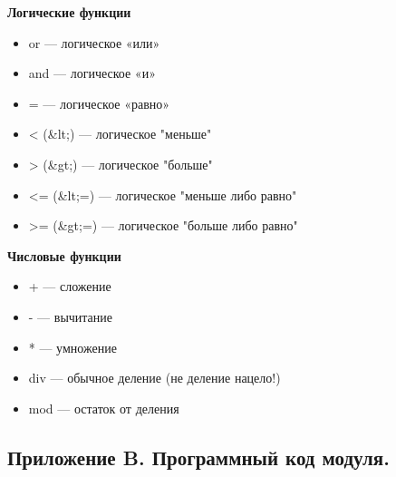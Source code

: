 \documentclass[12pt,a4paper,oneside]{article} %
\begin{document}
\textbf{Логические функции}

\begin{itemize}
\item or — логическое «или»
\item and — логическое «и»
\item = — логическое «равно»
\item < (\&lt;) — логическое "меньше"
\item > (\&gt;) — логическое "больше"
\item <= (\&lt;=) — логическое "меньше либо равно"
\item >= (\&gt;=) — логическое "больше либо равно"
\end{itemize}

\textbf{Числовые функции}

\begin{itemize}
\item + — сложение
\item - — вычитание
\item * — умножение
\item div — обычное деление (не деление нацело!)
\item mod — остаток от деления
\end{itemize}
\newpage
\subsection{Приложение B. Программный код модуля.}

\end{document}
